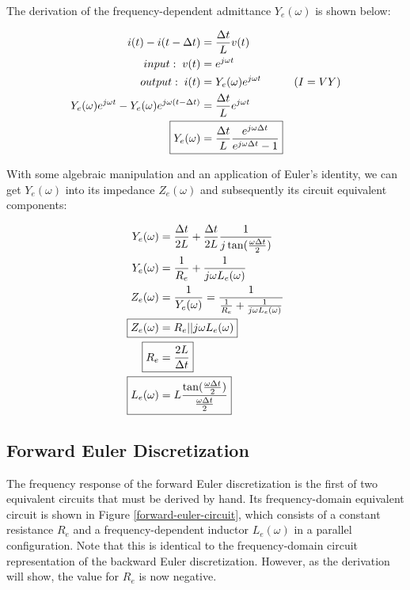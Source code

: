 \documentclass[10pt, oneside, letterpaper]{article}
\begin{document}
The derivation of the frequency-dependent admittance $Y_e{}(\omega{})$ is shown below:

\begin{alignat}{2}
i(t) - i(t - \Delta{}t) &= \frac{\Delta{}t}{L}v(t) \\
input:\;v(t) &= e^{j\omega{}t} \\
output:\;i(t) &= Y_e{}(\omega)e^{j\omega{}t} & (I = VY)\\
Y_e{}(\omega{})e^{j\omega{}t} - Y_e{}(\omega{})e^{j\omega{}(t-\Delta{}t)} &= \frac{\Delta{}t}{L}e^{j\omega{}t}\\
\Aboxed{Y_e{}(\omega{}) &= \frac{\Delta{}t}{L}\frac{e^{j\omega{}\Delta{}t}}{e^{j\omega{}\Delta{}t} - 1}}
\end{alignat}

With some algebraic manipulation and an application of Euler's identity, we can get $Y_e{}(\omega)$ into its impedance $Z_e{}(\omega)$ and subsequently its circuit equivalent components:

\begin{alignat}{2}
Y_e{}(\omega) &= \frac{\Delta{}t}{2L} + \frac{\Delta{}t}{2L}\frac{1}{j\tan(\frac{\omega{}\Delta{}t}{2})} \\
Y_e{}(\omega) &= \frac{1}{R_e} + \frac{1}{j\omega{}L_e(\omega{})} \\
Z_e{}(\omega) &= \frac{1}{Y_e{}(\omega)} = \frac{1}{\frac{1}{R_e} + \frac{1}{j\omega{}L_e(\omega{})}}\\
\Aboxed{Z_e{}(\omega) &= R_e || j\omega{}L_e{}(\omega{})} \\
\Aboxed{R_e &= \frac{2L}{\Delta{}t}} \\
\Aboxed{L_e(\omega) &= L\frac{\tan(\frac{\omega{}\Delta{}t}{2})}{\frac{\omega{}\Delta{}t}{2}}}
\end{alignat}

\subsection{Forward Euler Discretization}

The frequency response of the forward Euler discretization is the first of two equivalent circuits that must be derived by hand. Its frequency-domain equivalent circuit is shown in Figure \ref{forward-euler-circuit}, which consists of a constant resistance $R_e$ and a frequency-dependent inductor $L_e(\omega{})$ in a parallel configuration. Note that this is identical to the frequency-domain circuit representation of the backward Euler discretization. However, as the derivation will show, the value for $R_e$ is now negative.
\end{document}
